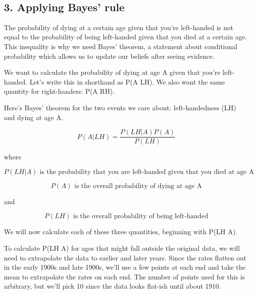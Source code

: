 \documentclass[11pt]{article}
\begin{document}
    \begin{center}
    \end{center}
    { \hspace*{\fill} \\}
    
    \subsection{3. Applying Bayes' rule}\label{applying-bayes-rule}

The probability of dying at a certain age given that you're left-handed
is not equal to the probability of being left-handed given that you died
at a certain age. This inequality is why we need Bayes' theorem, a
statement about conditional probability which allows us to update our
beliefs after seeing evidence.

We want to calculate the probability of dying at age A given that you're
left-handed. Let's write this in shorthand as P(A \textbar{} LH). We
also want the same quantity for right-handers: P(A \textbar{} RH).

Here's Bayes' theorem for the two events we care about: left-handedness
(LH) and dying at age A.

\[P(A | LH) = \frac{P(LH|A) P(A)}{P(LH)}\]

where

\[P(LH | A) \text{ is the probability that you are left-handed given that you died at age A}\]

\[P(A) \text{ is the overall probability of dying at age A}\]

and

\[P(LH) \text{ is the overall probability of being left-handed}\]

We will now calculate each of these three quantities, beginning with
P(LH \textbar{} A).

To calculate P(LH \textbar{} A) for ages that might fall outside the
original data, we will need to extrapolate the data to earlier and later
years. Since the rates flatten out in the early 1900s and late 1900s,
we'll use a few points at each end and take the mean to extrapolate the
rates on each end. The number of points used for this is arbitrary, but
we'll pick 10 since the data looks flat-ish until about 1910.
\end{document}
